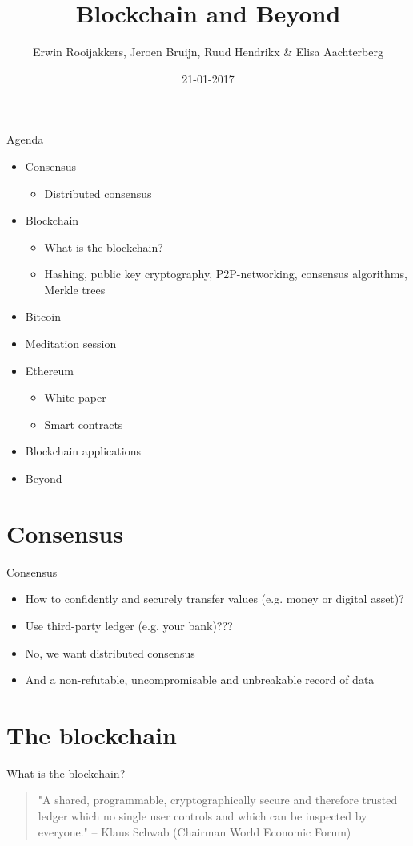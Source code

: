 \documentclass[presentation]{beamer}
\author{Erwin Rooijakkers, Jeroen Bruijn, Ruud Hendrikx \& Elisa Aachterberg}
\date{21-01-2017}
\title{Blockchain and Beyond}
\begin{document}
\maketitle

\begin{frame}[label=sec-0-1]{Agenda}
\begin{itemize}
\item Consensus
\begin{itemize}
\item Distributed consensus
\end{itemize}
\item Blockchain
\begin{itemize}
\item What is the blockchain?
\item Hashing, public key cryptography, P2P-networking, consensus algorithms, Merkle trees
\end{itemize}
\item \alert{Bitcoin}
\item Meditation session
\item \alert{Ethereum}
\begin{itemize}
\item White paper
\item Smart contracts
\end{itemize}
\item Blockchain applications
\item Beyond
\end{itemize}
\end{frame}

\section{Consensus}
\label{sec-1}
\begin{frame}[label=sec-1-1]{Consensus}
\begin{itemize}
\item How to \alert{confidently} and \alert{securely} transfer \alert{values} (e.g. money or digital asset)?
\item Use third-party ledger (e.g. your bank)???
\item \alert{No}, we want \alert{distributed consensus}
\item And a \alert{non-refutable}, \alert{uncompromisable} and \alert{unbreakable record} of data
\end{itemize}
\end{frame}
\section{The blockchain}
\label{sec-2}
\begin{frame}[label=sec-2-1]{What is the blockchain?}
\begin{quotation}
"A shared, programmable, cryptographically secure and therefore trusted ledger
which no single user controls and which can be inspected by everyone." -- Klaus
Schwab (Chairman World Economic Forum)
\end{quotation}
\end{frame}
\end{document}

